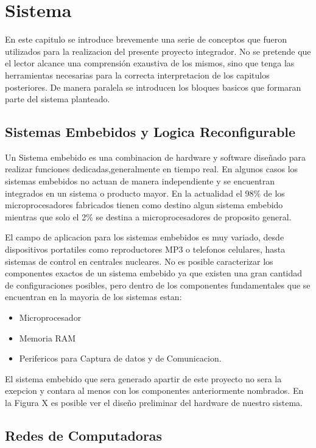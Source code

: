 \chapter{Sistema}
En este capitulo se introduce brevemente una serie de conceptos que fueron utilizados para la realizacion del presente proyecto integrador. No se pretende que el lector alcance una comprensión exaustiva de los mismos, sino que tenga las herramientas necesarias para la correcta interpretacion de los capitulos posteriores. De manera paralela se introducen los bloques basicos que formaran parte del sistema planteado.

\section{Sistemas Embebidos y Logica Reconfigurable}

Un Sistema embebido es una combinacion de hardware y software diseñado para realizar funciones dedicadas,generalmente en tiempo real. En algunos casos los sistemas embebidos no actuan de manera independiente y se encuentran integrados en un sistema o producto mayor.
En la actualidad el 98\% de los microprocesadores fabricados tienen como destino algun sistema embebido mientras que solo el 2\% se destina a microprocesadores de proposito general.

El campo de aplicacion para los sistemas embebidos es muy variado, desde dispositivos portatiles como reproductores MP3 o telefonos celulares, hasta sistemas de control en centrales nucleares.
No es posible caracterizar los componentes exactos de un sistema embebido ya que existen una gran cantidad de configuraciones posibles, pero dentro de los componentes fundamentales que se encuentran en la mayoria de los sistemas estan:

\begin{itemize}
\item Microprocesador
\item Memoria RAM 
\item Perifericos para Captura de datos y de Comunicacion.
\end{itemize}

El sistema embebido que sera generado apartir de este proyecto no sera la exepcion y contara al menos con los componentes anteriormente nombrados. En la Figura X es posible ver el diseño preliminar del hardware de nuestro sistema.





\section{Redes de Computadoras}

